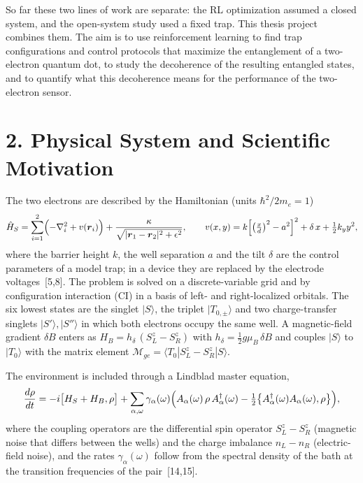 \documentclass[12pt,a4paper]{article}
\begin{document}
So far these two lines of work are separate: the RL optimization
assumed a closed system, and the open-system study used a fixed trap.
This thesis project combines them.  The aim is to use reinforcement
learning to find trap configurations and control protocols that
maximize the entanglement of a two-electron quantum dot, to study the
decoherence of the resulting entangled states, and to quantify what
this decoherence means for the performance of the two-electron sensor.

\section*{2. Physical System and Scientific Motivation}

The two electrons are described by the Hamiltonian (units
$\hbar^2/2m_e=1$)
\[
  \hat H_S=\sum_{i=1}^{2}\Bigl(-\nabla_i^2+v(\boldsymbol r_i)\Bigr)
  +\frac{\kappa}{\sqrt{|\boldsymbol r_1-\boldsymbol r_2|^2+\epsilon^2}},
  \qquad
  v(x,y)=k\Bigl[\bigl(\tfrac{x}{d}\bigr)^2-a^2\Bigr]^2+\delta\,x+\tfrac12k_yy^2,
\]
where the barrier height $k$, the well separation $a$ and the tilt
$\delta$ are the control parameters of a model trap; in a device they
are replaced by the electrode voltages~[5,8].  The problem is solved
on a discrete-variable grid and by configuration interaction (CI) in a
basis of left- and right-localized orbitals.  The six lowest states
are the singlet $|S\rangle$, the triplet $|T_{0,\pm}\rangle$ and two
charge-transfer singlets $|S'\rangle,|S''\rangle$ in which both
electrons occupy the same well.  A magnetic-field gradient
$\delta B$ enters as $H_B=h_\delta\,(S^z_L-S^z_R)$ with
$h_\delta=\tfrac12 g\mu_B\,\delta B$ and couples $|S\rangle$ to
$|T_0\rangle$ with the matrix element
$\mathcal M_{ge}=\langle T_0|S^z_L-S^z_R|S\rangle$.

The environment is included through a Lindblad master equation,
\[
  \frac{d\rho}{dt}=-i\bigl[H_S+H_B,\rho\bigr]
  +\sum_{\alpha,\omega}\gamma_\alpha(\omega)
  \Bigl(A_\alpha(\omega)\,\rho\,A_\alpha^\dagger(\omega)
  -\tfrac12\bigl\{A_\alpha^\dagger(\omega)A_\alpha(\omega),\rho\bigr\}\Bigr),
\]
where the coupling operators are the differential spin operator
$S^z_L-S^z_R$ (magnetic noise that differs between the wells) and the
charge imbalance $n_L-n_R$ (electric-field noise), and the rates
$\gamma_\alpha(\omega)$ follow from the spectral density of the bath
at the transition frequencies of the pair~[14,15].
\end{document}
